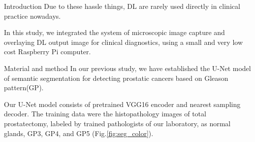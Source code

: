 \documentclass[
  dvipdfmx,
  xcolor={svgnames},
  hyperref={colorlinks,citecolor=DeepPink4,linkcolor=DarkRed,urlcolor=DarkBlue}
  ]{beamer}
\begin{document}
\begin{frame}{Introduction}
  Due to these hassle things, DL are rarely used directly in clinical practice nowadays.
  \par
  \vspace{0.5zh}
  In this study, we integrated the system of microscopic image capture and overlaying DL output image for clinical diagnostics, using a small and very low cost Raspberry Pi computer.
\end{frame}

\begin{frame}{Material and method}
  In our previous study, we have established the U-Net\cite{unet} model of semantic segmentation for detecting prostatic cancers based on Gleason pattern(GP).
  \par
  \vspace{0.5zh}
  Our U-Net model consists of pretrained VGG16\cite{vgg} encoder and nearest sampling decoder\cite{ternausnet}. The training data were the histopathology images of total prostatectomy, labeled by trained pathologists of our laboratory, as normal glands, GP3, GP4, and GP5 (Fig.\ref{fig:seg_color}).
\end{frame}
\end{document}
